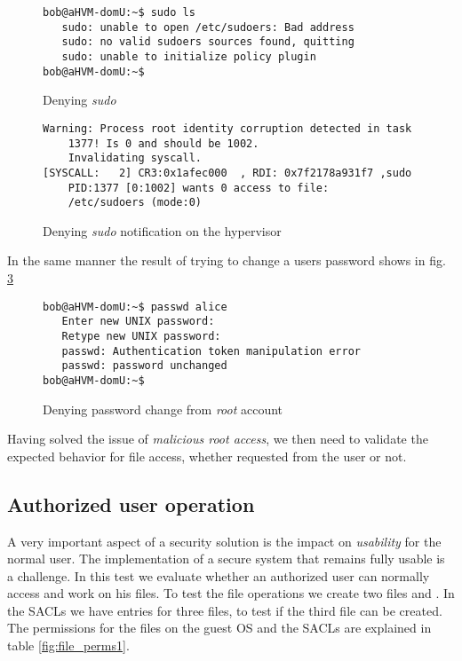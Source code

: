 \begin{figure}[ht]
	\centering
	\footnotesize{\selectfont 
		\begin{lstlisting}
bob@aHVM-domU:~$ sudo ls
   sudo: unable to open /etc/sudoers: Bad address
   sudo: no valid sudoers sources found, quitting
   sudo: unable to initialize policy plugin
bob@aHVM-domU:~$
		\end{lstlisting}}
	\caption{Denying \emph{sudo}}
	\label{fig:sudo_deny}
\end{figure}

\begin{figure}[ht]
	\centering
	\footnotesize{\selectfont 
		\begin{lstlisting}
Warning: Process root identity corruption detected in task 
	1377! Is 0 and should be 1002. 
	Invalidating syscall.
[SYSCALL:   2] CR3:0x1afec000  , RDI: 0x7f2178a931f7 ,sudo 
	PID:1377 [0:1002] wants 0 access to file: 
	/etc/sudoers (mode:0)
		\end{lstlisting}}
	\caption{Denying \emph{sudo} notification on the hypervisor}
	\label{fig:sudo_deny_not}
\end{figure}

\par In the same manner the result of trying to change a users password shows in fig. \ref{fig:passwd_deny}

\begin{figure}[ht]
	\centering
	\footnotesize{\selectfont 
		\begin{lstlisting}
bob@aHVM-domU:~$ passwd alice
   Enter new UNIX password:
   Retype new UNIX password:
   passwd: Authentication token manipulation error
   passwd: password unchanged
bob@aHVM-domU:~$
		\end{lstlisting}}
	\caption{Denying password change from \emph{root} account}
	\label{fig:passwd_deny}
\end{figure}


\par Having solved the issue of \emph{malicious root access}, we then need to validate the expected behavior for file access, whether requested from the  user or not.

\subsection{Authorized user operation}

\par A very important aspect of a security solution is the impact on \emph{usability} for the normal user. The implementation of a secure system that remains fully usable is a challenge. In this test we evaluate whether an authorized user can normally access and work on his files. To test the file operations we create two files  and . In the \acp{SACL} we have entries for three files, to test if the third file can be created. The permissions for the files on the guest \ac{OS} and the \acp{SACL} are explained in table \ref{fig:file_perms1}.

